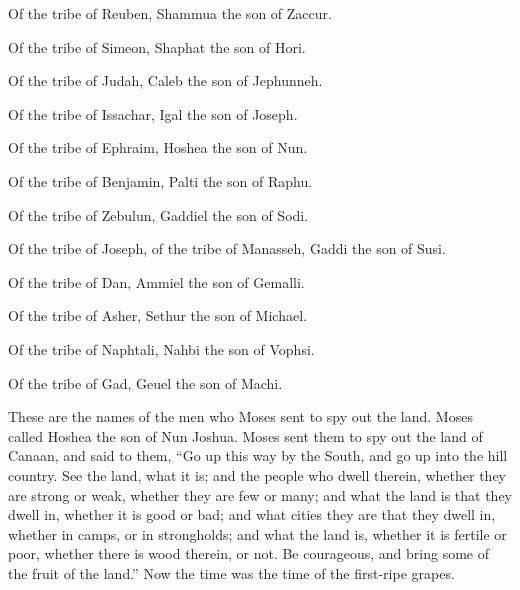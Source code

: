 Of the tribe of Reuben, Shammua the son of Zaccur.


\myverse{}Of the tribe of Simeon, Shaphat the son of Hori.


\myverse{}Of the tribe of Judah, Caleb the son of Jephunneh.


\myverse{}Of the tribe of Issachar, Igal the son of Joseph.


\myverse{}Of the tribe of Ephraim, Hoshea the son of Nun.


\myverse{}Of the tribe of Benjamin, Palti the son of Raphu.


\myverse{}Of the tribe of Zebulun, Gaddiel the son of Sodi.


\myverse{}Of the tribe of Joseph, of the tribe of Manasseh, Gaddi
the son of Susi.


\myverse{}Of the tribe of Dan, Ammiel the son of Gemalli.


\myverse{}Of the tribe of Asher, Sethur the son of Michael.


\myverse{}Of the tribe of Naphtali, Nahbi the son of Vophsi.


\myverse{}Of the tribe of Gad, Geuel the son of Machi.


\myverse{}These are the names of the men who Moses sent to spy
out the land. Moses called Hoshea the son of Nun Joshua.
\myverse{}Moses sent them to spy out the land of Canaan, and said to them, “Go up this
way by the South, and go up into the hill country.
\myverse{}See the land, what it is; and the people who dwell therein, whether they
are strong or weak, whether they are few or many;
\myverse{}and what the land is that they dwell in, whether it is good or bad; and what
cities they are that they dwell in, whether in camps, or in strongholds;
\myverse{}and what the land is, whether it is fertile or poor, whether there is wood
therein, or not. Be courageous, and bring some of the fruit of the land.” Now the time was the time of
the first-ripe grapes.


